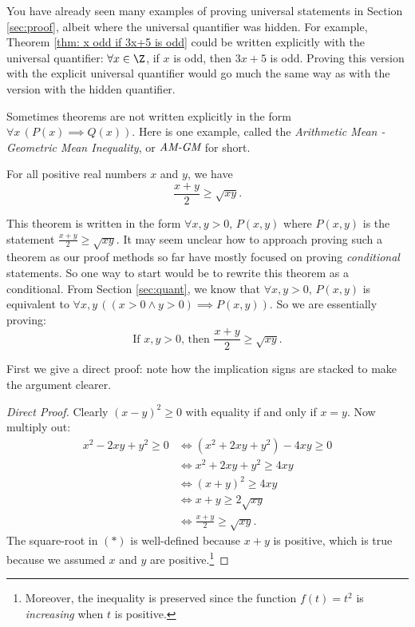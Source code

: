 You have already seen many examples of proving universal statements in Section \ref{sec:proof}, albeit where the universal quantifier was hidden. For example, Theorem \ref{thm: x odd if 3x+5 is odd} could be written explicitly with the universal quantifier: $\forall x \in \Z$, if $x$ is odd, then $3x + 5$ is odd. Proving this version with the explicit universal quantifier would go much the same way as with the version with the hidden quantifier. 

Sometimes theorems are not written explicitly in the form $\forall x \, (P(x) \implies Q(x))$. Here is one example, called the \emph{Arithmetic Mean - Geometric Mean Inequality}, or $\emph{AM-GM}$ for short.

\begin{thm}\label{thm:amgm}
For all positive real numbers $x$ and $y$, we have
    \[\frac{x+y}{2}\ge\sqrt{xy}.\]
\end{thm}

\noindent This theorem is written in the form $\forall x, y > 0, \, P(x,y)$ where $P(x,y)$ is the statement $\frac{x + y}{2} \geq \sqrt{xy}$. It may seem unclear how to approach proving such a theorem as our proof methods so far have mostly focused on proving \emph{conditional} statements. So one way to start would be to rewrite this theorem as a conditional. From Section \ref{sec:quant}, we know that $\forall x,y > 0, \, P(x,y)$ is equivalent to $\forall x,y \, ((x > 0 \land y > 0) \implies P(x,y))$. So we are essentially proving:
\[\text{If $x,y>0$, then $\frac{x+y}{2}\ge\sqrt{xy}$.}\]

\noindent First we give a direct proof: note how the implication signs are stacked to make the argument clearer.

\begin{proof}[Direct Proof]
Clearly $(x-y)^2\ge 0$ with equality if and only if $x=y$. Now multiply out:
\begin{align*}
x^2-2xy+y^2\ge 0&\iff (x^2+2xy+y^2)- 4xy  \ge 0 \\
&\iff x^2+2xy+y^2\ge 4xy\\
&\iff (x+y)^2\ge 4xy\\
&\iff x+y\ge 2\sqrt{xy}\tag*{($\ast$)}\\
&\iff \frac{x+y}{2}\ge \sqrt{xy}.
\end{align*}
The square-root in $(\ast)$ is well-defined because $x+y$ is positive, which is true because we assumed $x$ and $y$ are positive.\footnote{Moreover, the inequality is preserved since the function $f(t)=t^2$ is \emph{increasing} when $t$ is positive.}
\end{proof}

